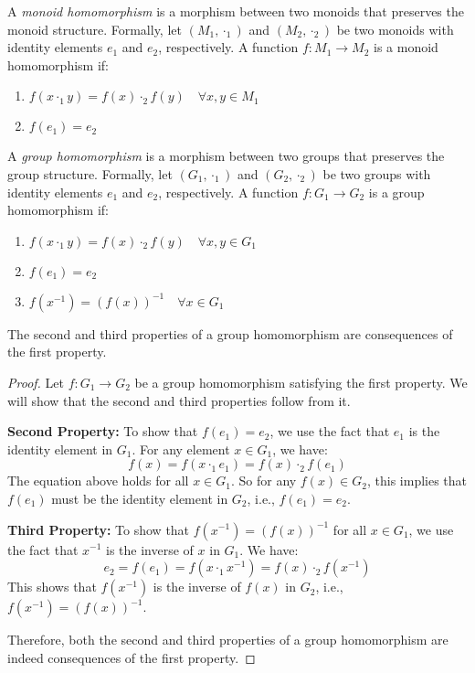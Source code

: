 \documentclass[
	11pt, %
	fleqn, %
	a4paper, %
]{LegrandOrangeBook}
\begin{document}
\begin{definition}
    A \emph{monoid homomorphism} is a morphism between two monoids that preserves the monoid structure. Formally, let $(M_1, \cdot_1)$ and $(M_2, \cdot_2)$ be two monoids with identity elements $e_1$ and $e_2$, respectively. A function $f: M_1 \to M_2$ is a monoid homomorphism if:
    \begin{enumerate}
        \item $f(x \cdot_1 y) = f(x) \cdot_2 f(y) \quad \forall x, y \in M_1$
        \item $f(e_1) = e_2$
    \end{enumerate}
\end{definition}

\begin{definition}
    A \emph{group homomorphism} is a morphism between two groups that preserves the group structure. Formally, let $(G_1, \cdot_1)$ and $(G_2, \cdot_2)$ be two groups with identity elements $e_1$ and $e_2$, respectively. A function $f: G_1 \to G_2$ is a group homomorphism if:
    \begin{enumerate}
        \item $f(x \cdot_1 y) = f(x) \cdot_2 f(y) \quad \forall x, y \in G_1$
        \item $f(e_1) = e_2$
        \item $f(x^{-1}) = (f(x))^{-1} \quad \forall x \in G_1$
    \end{enumerate}
\end{definition}

\begin{proposition}
    The second and third properties of a group homomorphism are consequences of the first property.
\end{proposition}

\begin{proof}
    Let $f: G_1 \to G_2$ be a group homomorphism satisfying the first property. We will show that the second and third properties follow from it.

    \textbf{Second Property:} To show that $f(e_1) = e_2$, we use the fact that $e_1$ is the identity element in $G_1$. For any element $x \in G_1$, we have:
    \[
        f(x) = f(x \cdot_1 e_1) = f(x) \cdot_2 f(e_1)
    \]
    The equation above holds for all $x \in G_1$. So for any $f(x) \in G_2$, this implies that $f(e_1)$ must be the identity element in $G_2$, i.e., $f(e_1) = e_2$.

    \textbf{Third Property:} To show that $f(x^{-1}) = (f(x))^{-1}$ for all $x \in G_1$, we use the fact that $x^{-1}$ is the inverse of $x$ in $G_1$. We have:
    \[
        e_2 = f(e_1) = f(x \cdot_1 x^{-1}) = f(x) \cdot_2 f(x^{-1})
    \]
    This shows that $f(x^{-1})$ is the inverse of $f(x)$ in $G_2$, i.e., $f(x^{-1}) = (f(x))^{-1}$.

    Therefore, both the second and third properties of a group homomorphism are indeed consequences of the first property.
\end{proof}
\end{document}
